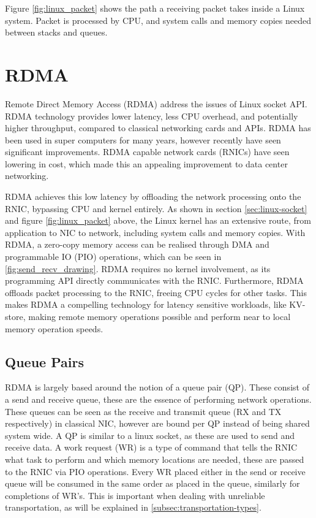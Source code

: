 Figure \ref{fig:linux_packet} shows the path a receiving packet takes inside a Linux system.
Packet is processed by CPU, and system calls and memory copies needed between stacks and queues.

\section[RDMA]{RDMA}\label{sec:rdma}
Remote Direct Memory Access (RDMA) address the issues of Linux socket API.
RDMA technology provides lower latency, less CPU overhead, and potentially higher throughput, compared to classical networking cards and APIs.
RDMA has been used in super computers for many years, however recently have seen significant improvements.
RDMA capable network cards (RNICs) have seen lowering in cost\cite{kalia2016design}, which made this an appealing improvement to data center networking.

RDMA achieves this low latency by offloading the network processing onto the RNIC, bypassing CPU and kernel entirely.
As shown in section \ref{sec:linux-socket} and figure \ref{fig:linux_packet} above, the Linux kernel has an extensive route, from application to NIC to network, including system calls and memory copies.
With RDMA, a zero-copy memory access can be realised through DMA and programmable IO (PIO) operations, which can be seen in \ref{fig:send_recv_drawing}.
RDMA requires no kernel involvement, as its programming API directly communicates with the RNIC.
Furthermore, RDMA offloads packet processing to the RNIC, freeing CPU cycles for other tasks.
This makes RDMA a compelling technology for latency sensitive workloads, like KV-store, making remote memory operations possible and perform near to local memory operation speeds.

\subsection{Queue Pairs}\label{subsec:queue-pairs}
RDMA is largely based around the notion of a queue pair (QP).
These consist of a send and receive queue, these are the essence of performing network operations.
These queues can be seen as the receive and transmit queue (RX and TX respectively) in classical NIC, however are bound per QP instead of being shared system wide.
A QP is similar to a linux socket, as these are used to send and receive data.
A work request (WR) is a type of command that tells the RNIC what task to perform and which memory locations are needed, these are passed to the RNIC via PIO operations.
Every WR placed either in the send or receive queue will be consumed in the same order as placed in the queue, similarly for completions of WR's.
This is important when dealing with unreliable transportation, as will be explained in \ref{subsec:transportation-types}.

